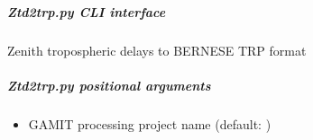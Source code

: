 \documentclass[letterpaper,10pt,english]{sphinxmanual}
\begin{document}
\begin{fulllineitems}
\label{\detokenize{pgamit.com:pgamit.com.Ztd2trp.main}}
\pysigstartsignatures
\pysiglinewithargsret
{}
{}
{}
\pysigstopsignatures
\end{fulllineitems}



\subparagraph{Ztd2trp.py \sphinxhyphen{} CLI interface}
\label{\detokenize{pgamit.com:Ztd2trp.py---CLI-interface}}
\sphinxAtStartPar
Zenith tropospheric delays to BERNESE TRP format

\begin{sphinxVerbatim}[commandchars=\\\{\}]
 \PYG{p}{[}\PYG{p}{]} \PYG{p}{[}\PYG{p}{]} \PYG{p}{[}\PYG{p}{]} \PYG{p}{[}  \PYG{p}{[} \PYG{p}{]}\PYG{p}{]}
           \PYG{p}{[} \PYG{p}{]}
\end{sphinxVerbatim}


\subparagraph{Ztd2trp.py positional arguments}
\label{\detokenize{pgamit.com:Ztd2trp.py-positional-arguments}}\begin{itemize}
\item {} 
\sphinxAtStartPar
{\hyperref[\detokenize{pgamit.com:Ztd2trp.py-project_name}]{}} \sphinxhyphen{} GAMIT processing project name (default: )

\end{itemize}
\end{document}
